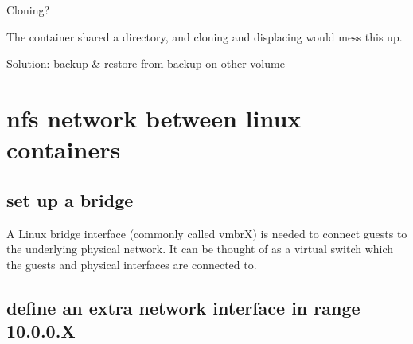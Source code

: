 \documentclass[letterpaper,10pt,english]{sphinxmanual}
\begin{document}
\sphinxAtStartPar
Cloning?

\sphinxAtStartPar
The container shared a directory, and cloning and displacing would mess this up.

\sphinxAtStartPar
Solution:
backup \& restore from backup on other volume

\sphinxstepscope


\chapter{nfs network between linux containers}
\label{\detokenize{nfs_netwerk:nfs-network-between-linux-containers}}\label{\detokenize{nfs_netwerk::doc}}

\section{set up a bridge}
\label{\detokenize{nfs_netwerk:set-up-a-bridge}}
\sphinxAtStartPar
A Linux bridge interface (commonly called vmbrX) is needed to connect guests to the underlying physical network. It can be thought of as a virtual switch which the guests and physical interfaces are connected to.


\section{define an extra network interface in range 10.0.0.X}
\label{\detokenize{nfs_netwerk:define-an-extra-network-interface-in-range-10-0-0-x}}
\sphinxstepscope
\end{document}
